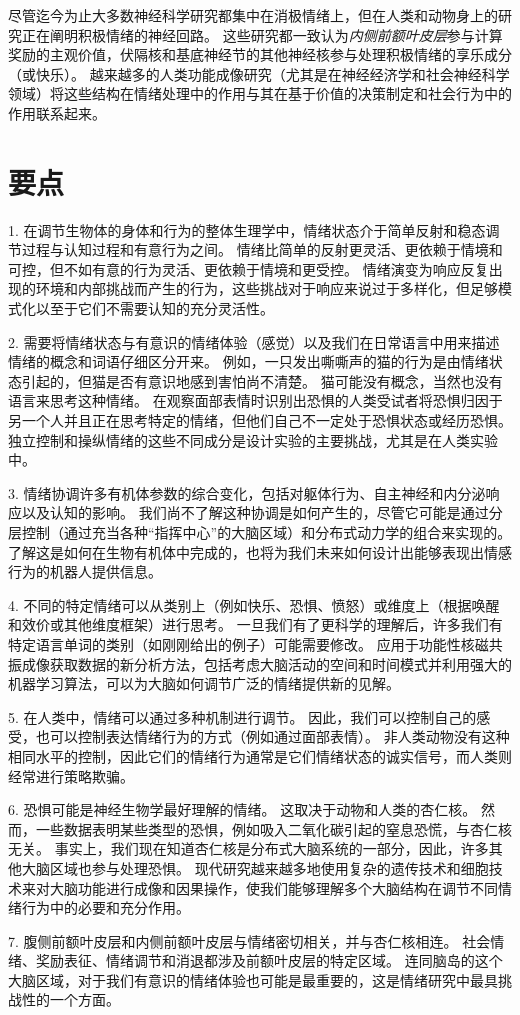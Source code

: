 尽管迄今为止大多数神经科学研究都集中在消极情绪上，但在人类和动物身上的研究正在阐明积极情绪的神经回路。
这些研究都一致认为\textit{内侧前额叶皮层}参与计算奖励的主观价值，伏隔核和基底神经节的其他神经核参与处理积极情绪的享乐成分（或快乐）。
越来越多的人类功能成像研究（尤其是在神经经济学和社会神经科学领域）将这些结构在情绪处理中的作用与其在基于价值的决策制定和社会行为中的作用联系起来。



\section{要点}

1. 在调节生物体的身体和行为的整体生理学中，情绪状态介于简单反射和稳态调节过程与认知过程和有意行为之间。
情绪比简单的反射更灵活、更依赖于情境和可控，但不如有意的行为灵活、更依赖于情境和更受控。
情绪演变为响应反复出现的环境和内部挑战而产生的行为，这些挑战对于响应来说过于多样化，但足够模式化以至于它们不需要认知的充分灵活性。


2. 需要将情绪状态与有意识的情绪体验（感觉）以及我们在日常语言中用来描述情绪的概念和词语仔细区分开来。
例如，一只发出嘶嘶声的猫的行为是由情绪状态引起的，但猫是否有意识地感到害怕尚不清楚。
猫可能没有概念，当然也没有语言来思考这种情绪。
在观察面部表情时识别出恐惧的人类受试者将恐惧归因于另一个人并且正在思考特定的情绪，但他们自己不一定处于恐惧状态或经历恐惧。
独立控制和操纵情绪的这些不同成分是设计实验的主要挑战，尤其是在人类实验中。


3. 情绪协调许多有机体参数的综合变化，包括对躯体行为、自主神经和内分泌响应以及认知的影响。
我们尚不了解这种协调是如何产生的，尽管它可能是通过分层控制（通过充当各种“指挥中心”的大脑区域）和分布式动力学的组合来实现的。
了解这是如何在生物有机体中完成的，也将为我们未来如何设计出能够表现出情感行为的机器人提供信息。


4. 不同的特定情绪可以从类别上（例如快乐、恐惧、愤怒）或维度上（根据唤醒和效价或其他维度框架）进行思考。
一旦我们有了更科学的理解后，许多我们有特定语言单词的类别（如刚刚给出的例子）可能需要修改。
应用于功能性核磁共振成像获取数据的新分析方法，包括考虑大脑活动的空间和时间模式并利用强大的机器学习算法，可以为大脑如何调节广泛的情绪提供新的见解。


5. 在人类中，情绪可以通过多种机制进行调节。
因此，我们可以控制自己的感受，也可以控制表达情绪行为的方式（例如通过面部表情）。
非人类动物没有这种相同水平的控制，因此它们的情绪行为通常是它们情绪状态的诚实信号，而人类则经常进行策略欺骗。


6. 恐惧可能是神经生物学最好理解的情绪。
这取决于动物和人类的杏仁核。
然而，一些数据表明某些类型的恐惧，例如吸入二氧化碳引起的窒息恐慌，与杏仁核无关。
事实上，我们现在知道杏仁核是分布式大脑系统的一部分，因此，许多其他大脑区域也参与处理恐惧。
现代研究越来越多地使用复杂的遗传技术和细胞技术来对大脑功能进行成像和因果操作，使我们能够理解多个大脑结构在调节不同情绪行为中的必要和充分作用。


7. 腹侧前额叶皮层和内侧前额叶皮层与情绪密切相关，并与杏仁核相连。
社会情绪、奖励表征、情绪调节和消退都涉及前额叶皮层的特定区域。
连同脑岛的这个大脑区域，对于我们有意识的情绪体验也可能是最重要的，这是情绪研究中最具挑战性的一个方面。

